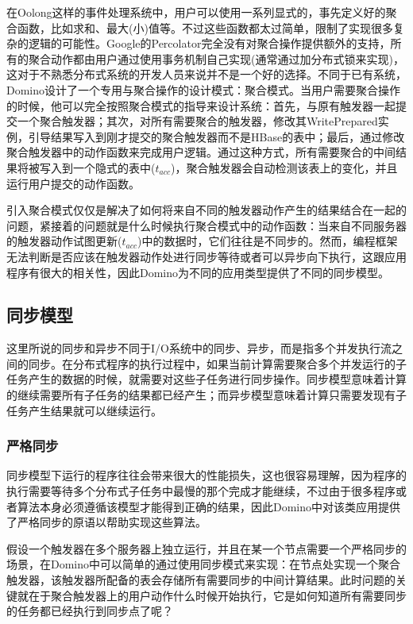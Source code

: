 在Oolong这样的事件处理系统中，用户可以使用一系列显式的，事先定义好的聚合函数，比如求和、最大(小)值等。不过这些函数都太过简单，限制了实现很多复杂的逻辑的可能性。Google的Percolator完全没有对聚合操作提供额外的支持，所有的聚合动作都由用户通过使用事务机制自己实现(通常通过加分布式锁来实现)，这对于不熟悉分布式系统的开发人员来说并不是一个好的选择。不同于已有系统，Domino设计了一个专用与聚合操作的设计模式：聚合模式。当用户需要聚合操作的时候，他可以完全按照聚合模式的指导来设计系统：首先，与原有触发器一起提交一个聚合触发器；其次，对所有需要聚合的触发器，修改其WritePrepared实例，引导结果写入到刚才提交的聚合触发器而不是HBase的表中；最后，通过修改聚合触发器中的动作函数来完成用户逻辑。通过这种方式，所有需要聚合的中间结果将被写入到一个隐式的表中($t_{acc}$)，聚合触发器会自动检测该表上的变化，并且运行用户提交的动作函数。

引入聚合模式仅仅是解决了如何将来自不同的触发器动作产生的结果结合在一起的问题，紧接着的问题就是什么时候执行聚合模式中的动作函数：当来自不同服务器的触发器动作试图更新($t_{acc}$)中的数据时，它们往往是不同步的。然而，编程框架无法判断是否应该在触发器动作处进行同步等待或者可以异步向下执行，这跟应用程序有很大的相关性，因此Domino为不同的应用类型提供了不同的同步模型。


\subsection{同步模型}
\label{section:sync}
这里所说的同步和异步不同于I/O系统中的同步、异步，而是指多个并发执行流之间的同步。在分布式程序的执行过程中，如果当前计算需要聚合多个并发运行的子任务产生的数据的时候，就需要对这些子任务进行同步操作。同步模型意味着计算的继续需要所有子任务的结果都已经产生；而异步模型意味着计算只需要发现有子任务产生结果就可以继续运行。

\subsubsection{严格同步}

同步模型下运行的程序往往会带来很大的性能损失，这也很容易理解，因为程序的执行需要等待多个分布式子任务中最慢的那个完成才能继续，不过由于很多程序或者算法本身必须遵循该模型才能得到正确的结果，因此Domino中对该类应用提供了严格同步的原语以帮助实现这些算法。

假设一个触发器在多个服务器上独立运行，并且在某一个节点需要一个严格同步的场景，在Domino中可以简单的通过使用同步模式来实现：在节点处实现一个聚合触发器，该触发器所配备的表会存储所有需要同步的中间计算结果。此时问题的关键就在于聚合触发器上的用户动作什么时候开始执行，它是如何知道所有需要同步的任务都已经执行到同步点了呢？

